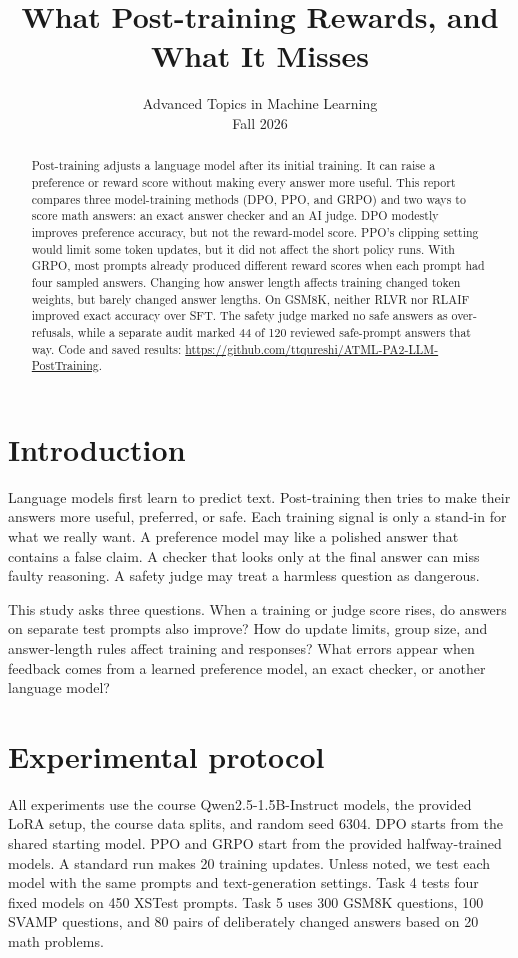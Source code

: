 \documentclass[10pt]{article}
\title{What Post-training Rewards, and What It Misses}
\author{Advanced Topics in Machine Learning\\Fall 2026}
\begin{document}
\maketitle

\begin{abstract}
Post-training adjusts a language model after its initial training. It can raise a preference or reward score without making every answer more useful. This report compares three model-training methods (DPO, PPO, and GRPO) and two ways to score math answers: an exact answer checker and an AI judge. DPO modestly improves preference accuracy, but not the reward-model score. PPO's clipping setting would limit some token updates, but it did not affect the short policy runs. With GRPO, most prompts already produced different reward scores when each prompt had four sampled answers. Changing how answer length affects training changed token weights, but barely changed answer lengths. On GSM8K, neither RLVR nor RLAIF improved exact accuracy over SFT. The safety judge marked no safe answers as over-refusals, while a separate audit marked 44 of 120 reviewed safe-prompt answers that way. Code and saved results: \url{https://github.com/ttqureshi/ATML-PA2-LLM-PostTraining}.
\end{abstract}

\section{Introduction}
Language models first learn to predict text. Post-training then tries to make their answers more useful, preferred, or safe. Each training signal is only a stand-in for what we really want. A preference model may like a polished answer that contains a false claim. A checker that looks only at the final answer can miss faulty reasoning. A safety judge may treat a harmless question as dangerous.

This study asks three questions. When a training or judge score rises, do answers on separate test prompts also improve? How do update limits, group size, and answer-length rules affect training and responses? What errors appear when feedback comes from a learned preference model, an exact checker, or another language model?

\section{Experimental protocol}
All experiments use the course Qwen2.5-1.5B-Instruct models, the provided LoRA setup, the course data splits, and random seed 6304. DPO starts from the shared starting model. PPO and GRPO start from the provided halfway-trained models. A standard run makes 20 training updates. Unless noted, we test each model with the same prompts and text-generation settings. Task 4 tests four fixed models on 450 XSTest prompts. Task 5 uses 300 GSM8K questions, 100 SVAMP questions, and 80 pairs of deliberately changed answers based on 20 math problems.
\end{document}
